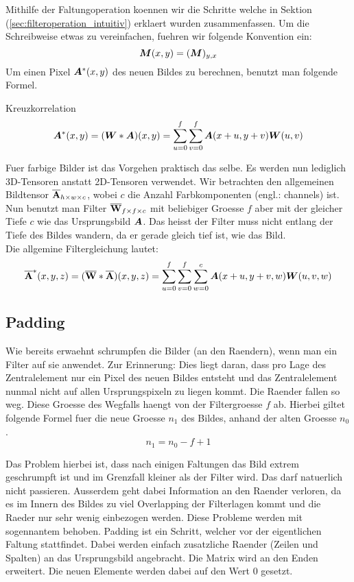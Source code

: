 \para{}

Mithilfe der Faltungoperation koennen wir die Schritte welche in Sektion
(\ref{sec:filteroperation_intuitiv}) erklaert wurden zusammenfassen. Um die
Schreibweise etwas zu vereinfachen, fuehren wir folgende Konvention ein:
\[ \bm{M}(x,y) = (\bm{M})_{y,x}\]
Um einen Pixel $\bm{A}^*(x,y)$ des neuen Bildes zu berechnen, benutzt man folgende Formel.

Kreuzkorrelation
\begin{equation}
  \bm{A}^*(x,y) = (\bm{W} * \bm{A})(x,y) = \sum_{u=0}^f \sum_{v=0}^f \bm{A}(x+u,y+v)\bm{W}(u,v)
\end{equation}


Fuer farbige Bilder ist das Vorgehen praktisch das selbe. Es werden nun
lediglich 3D-Tensoren anstatt 2D-Tensoren verwendet. Wir betrachten den
allgemeinen Bildtensor $\overline{\mathbf{A}}_{h \times w \times c}$, wobei $c$ die Anzahl
Farbkomponenten (engl.: channels) ist.
Nun benutzt man Filter $\overline{\mathbf{W}}_{f \times f \times c}$ mit beliebiger Groesse
$f$ aber mit der gleicher Tiefe $c$ wie das Ursprungsbild $\bm{A}$.
Das heisst der Filter muss nicht entlang der Tiefe des Bildes wandern, da er
gerade gleich tief ist, wie das Bild. \\
Die allgemine Filtergleichung lautet:
\begin{equation}
  \overline{\mathbf{A}}^*(x,y,z) = (\overline{\mathbf{W}} * \overline{\mathbf{A}})(x,y,z) = \sum_{u=0}^f \sum_{v=0}^f \sum_{w=0}^c \bm{A}(x+u,y+v,w)\bm{W}(u,v,w)
\end{equation}


\subsection{Padding}
Wie bereits erwaehnt schrumpfen die Bilder (an den Raendern), wenn man ein Filter auf sie anwendet.
Zur Erinnerung: Dies liegt daran, dass pro Lage des Zentralelement nur ein Pixel
des neuen Bildes entsteht und das Zentralelement nunmal nicht auf allen
Ursprungspixeln zu liegen kommt. Die Raender fallen so weg. Diese Groesse des
Wegfalls haengt von der Filtergroesse $f$ ab. Hierbei giltet folgende Formel fuer die
neue Groesse $n_1$ des Bildes, anhand der alten Groesse $n_0$.
\begin{equation}
  n_1 = n_0 - f + 1
\end{equation}

Das Problem hierbei ist, dass nach einigen Faltungen das Bild extrem geschrumpft
ist und im Grenzfall kleiner als der Filter wird. Das darf natuerlich nicht
passieren. Ausserdem geht dabei Information an den Raender verloren, da es im
Innern des Bildes zu viel Overlapping der Filterlagen kommt und die Raeder nur
sehr wenig einbezogen werden.
\para{}
Diese Probleme werden mit sogennantem  behoben. Padding ist ein
Schritt, welcher vor der eigentlichen Faltung stattfindet. Dabei werden einfach
zusatzliche Raender (Zeilen und Spalten) an das Ursprungsbild angebracht. Die
Matrix wird an den Enden erweitert. Die neuen Elemente werden dabei auf den Wert
$0$ gesetzt.

